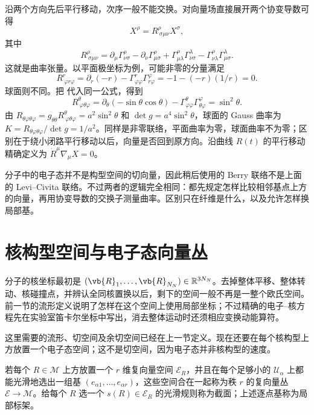 沿两个方向先后平行移动，次序一般不能交换。对向量场直接展开两个协变导数可得
\begin{equation}
[\nabla_\mu,\nabla_\nu]X^\rho
=R^\rho_{\ \sigma\mu\nu}X^\sigma,
\label{eq:bh-riemann-commutator}
\end{equation}
其中
\begin{equation}
R^\rho_{\ \sigma\mu\nu}
=\partial_\mu\Gamma^\rho_{\nu\sigma}
-\partial_\nu\Gamma^\rho_{\mu\sigma}
+\Gamma^\rho_{\mu\lambda}\Gamma^\lambda_{\nu\sigma}
-\Gamma^\rho_{\nu\lambda}\Gamma^\lambda_{\mu\sigma}.
\label{eq:bh-riemann-components}
\end{equation}
这就是曲率张量。以平面极坐标为例，可能非零的分量满足
\[
R^r_{\ \varphi r\varphi}
=\partial_r(-r)
-\Gamma^r_{\varphi\varphi}\Gamma^\varphi_{r\varphi}
=-1-(-r)(1/r)=0.
\]
球面则不同。把  代入同一公式，得到
\[
R^\theta_{\ \varphi\theta\varphi}
=\partial_\theta(-\sin\theta\cos\theta)
-\Gamma^\theta_{\varphi\varphi}\Gamma^\varphi_{\theta\varphi}
=\sin^2\theta.
\]
由 \(R_{\theta\varphi\theta\varphi}=g_{\theta\theta}R^\theta_{\ \varphi\theta\varphi}=a^2\sin^2\theta\) 和 \(\det g=a^4\sin^2\theta\)，球面的 Gauss 曲率为 \(K=R_{\theta\varphi\theta\varphi}/\det g=1/a^2\)。同样是非零联络，平面曲率为零，球面曲率不为零；区别在于绕小闭路平行移动以后，向量是否回到原方向。沿曲线 \(R(t)\) 的平行移动精确定义为 \(\dot R^\mu\nabla_\mu X=0\)。

分子中的电子态并不是构型空间的切向量，因此稍后使用的 Berry 联络不是上面的 Levi--Civita 联络。不过两者的逻辑完全相同：都先规定怎样比较相邻基点上方的向量，再用协变导数的交换子测量曲率。区别只在纤维是什么，以及允许怎样换局部基。

\section{核构型空间与电子态向量丛}

分子的核坐标最初是
\((\vb{R}_1,\ldots,\vb{R}_{N_N})\in\mathbb R^{3N_N}\)。去掉整体平移、整体转动、核碰撞点，并辨认全同核置换以后，剩下的空间一般不再是一整个欧氏空间。前一节的流形定义说明了怎样在这个空间上使用局部坐标；不过精确的电子--核方程先在实验室笛卡尔坐标中写出，消去整体运动时还须相应变换动能算符。

这里需要的流形、切空间及余切空间已经在上一节定义。现在还要在每个核构型上方放置一个电子态空间；这不是切空间，因为电子态并非核构型的速度。

\begin{definition}
若每个 \(R\in\mathcal M\) 上方放置一个 \(r\) 维复向量空间
\(\mathcal E_R\)，并且在每个足够小的
\(\mathcal U_\alpha\) 上都能光滑地选出一组基
\((e_{\alpha1},\ldots,e_{\alpha r})\)，这些空间合在一起称为秩
\(r\) 的复向量丛 \(\mathcal E\to\mathcal M\)。给每个 \(R\) 选一个
\(s(R)\in\mathcal E_R\) 的光滑规则称为截面；上述逐点基称为局部标架。
\end{definition}

